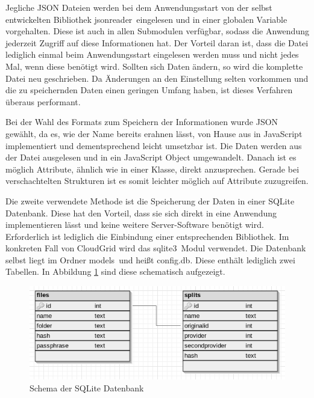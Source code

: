 Jegliche \ac{JSON} Dateien werden bei dem Anwendungsstart von der selbst entwickelten Bibliothek \frqq jsonreader\flqq\ eingelesen und in einer globalen Variable vorgehalten.
Diese ist auch in allen Submodulen verfügbar, sodass die Anwendung jederzeit Zugriff auf diese Informationen hat.
Der Vorteil daran ist, dass die Datei lediglich einmal beim Anwendungsstart eingelesen werden muss und nicht jedes Mal, wenn diese benötigt wird.
Sollten sich Daten ändern, so wird die komplette Datei neu geschrieben.
Da Änderungen an den Einstellung selten vorkommen und die zu speichernden Daten einen geringen Umfang haben, ist dieses Verfahren überaus performant.

Bei der Wahl des Formats zum Speichern der Informationen wurde \ac{JSON} gewählt, da es, wie der Name bereits erahnen lässt, von Hause aus in JavaScript implementiert und dementsprechend leicht umsetzbar ist.
Die Daten werden aus der Datei ausgelesen und in ein JavaScript Object umgewandelt.
Danach ist es möglich Attribute, ähnlich wie in einer Klasse, direkt anzusprechen.
Gerade bei verschachtelten Strukturen ist es somit leichter möglich auf Attribute zuzugreifen.

Die zweite verwendete Methode ist die Speicherung der Daten in einer SQLite Datenbank.
Diese hat den Vorteil, dass sie sich direkt in eine Anwendung implementieren lässt und keine weitere Server-Software benötigt wird.
Erforderlich ist lediglich die Einbindung einer entsprechenden Bibliothek.
Im konkreten Fall von CloudGrid wird das \frqq sqlite3\flqq\ Modul verwendet.
Die Datenbank selbst liegt im Ordner \frqq models\flqq\ und heißt config.db.
Diese enthält lediglich zwei Tabellen.
In Abbildung \ref{fig-implementierung-sql} sind diese schematisch aufgezeigt.

\begin{figure}[H]
  \centering
  \includegraphics[scale=0.6]{resources/Bilder_Kapitel_5/sql.png}
  \caption{Schema der SQLite Datenbank}
  \label{fig-implementierung-sql}
\end{figure}

